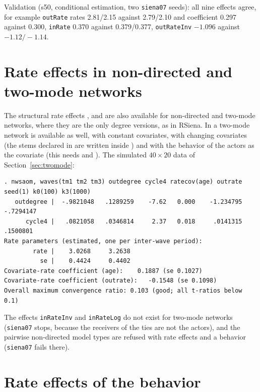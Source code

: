 Validation (s50, conditional estimation, two \texttt{siena07} seeds): all nine effects agree, for example \texttt{outRate} rates 2.81/2.15 against 2.79/2.10 and coefficient 0.297 against 0.300, \texttt{inRate} 0.370 against 0.379/0.377, \texttt{outRateInv} $-1.096$ against $-1.12/-1.14$.

\section{Rate effects in non-directed and two-mode networks}\label{sec:rate-newtypes}

The structural rate effects ,  and  are also available for non-directed and two-mode networks, where they are the only degree versions, as in RSiena. In a two-mode network  is available as well, with constant covariates, with changing covariates (the stems declared in  are written inside ) and with the behavior of the actors as the covariate (this needs  and ). The simulated $40\times20$ data of Section~\ref{sec:twomode}:
\begin{lstlisting}
. nwsaom, waves(tm1 tm2 tm3) outdegree cycle4 ratecov(age) outrate seed(1) k0(100) k3(1000)
   outdegree |  -.9821048   .1289259    -7.62   0.000    -1.234795   -.7294147
      cycle4 |   .0821058   .0346814     2.37   0.018     .0141315    .1500801
Rate parameters (estimated, one per inter-wave period):
        rate |    3.0268     3.2638 
          se |    0.4424     0.4402 
Covariate-rate coefficient (age):    0.1887 (se 0.1027)
Covariate-rate coefficient (outrate):   -0.1548 (se 0.1098)
Overall maximum convergence ratio: 0.103 (good; all t-ratios below 0.1)
\end{lstlisting}
The effects \texttt{inRateInv} and \texttt{inRateLog} do not exist for two-mode networks (\texttt{siena07} stops, because the receivers of the ties are not the actors), and the pairwise non-directed model types are refused with rate effects and a behavior (\texttt{siena07} fails there).

\section{Rate effects of the behavior}\label{sec:behrate}

